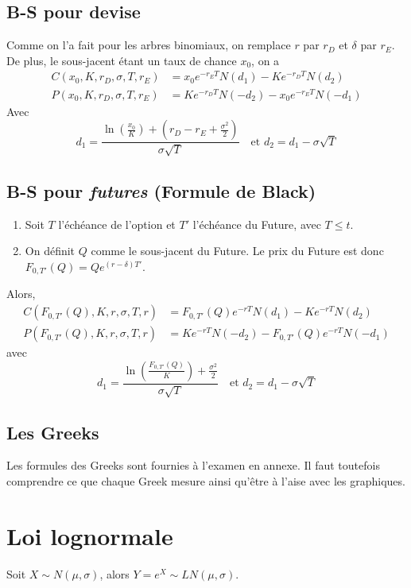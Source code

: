 \documentclass[10pt, french]{article}
\begin{document}
\begin{multicols*}{2}
\subsection*{B-S pour devise}
Comme on l'a fait pour les arbres binomiaux, on remplace $r$ par $r_D$ et $\delta$ par $r_E$. De plus, le sous-jacent étant un taux de chance $x_0$, on a
\begin{align*}
C(x_0, K, r_D, \sigma , T, r_E) & = x_0 e^{-r_E T} N(d_1) - K e^{-r_D T} N(d_2) \\
P(x_0, K, r_D, \sigma , T, r_E) & = K e^{-r_D T} N(-d_2) - x_0 e^{-r_E T} N(-d_1) 
\end{align*}
Avec 
\[d_1 = \frac{\ln \left( \frac{x_0}{K}  \right) + \left( r_D - r_E + \frac{\sigma^2}{2} \right)}{\sigma \sqrt{T}}  \ \ \  \text{ et } d_2 = d_1 - \sigma \sqrt{T} \]


\subsection*{B-S pour \emph{futures} (Formule de Black)}
\begin{enumerate}
\item Soit $T$ l'échéance de l'option et $T' $ l'échéance du Future, avec $T \leq t$.
\item On définit $Q$ comme le sous-jacent du Future. Le prix du Future est donc $F_{0, T'}(Q) = Q e^{(r-\delta) T'}$. 
\end{enumerate}
Alors,
\begin{align*}
C(F_{0, T'}(Q), K, r, \sigma, T, r) & = F_{0, T'}(Q) e^{-r T} N(d_1) - K e^{-r T} N(d_2) \\
P(F_{0, T'}(Q), K, r, \sigma, T, r) & = K e^{-r T} N(-d_2) -  F_{0, T'}(Q) e^{-r T} N(- d_1)
\end{align*}
avec
\[d_1 = \frac{\ln \left( \frac{F_{0,T'}(Q)}{K} \right) + \frac{\sigma^2}{2}}{\sigma \sqrt{T}}    \ \ \  \text{ et } d_2 = d_1 - \sigma \sqrt{T} \]

\subsection*{Les Greeks}
Les formules des Greeks sont fournies à l'examen en annexe. Il faut toutefois comprendre ce que chaque Greek mesure ainsi qu'être à l'aise avec les graphiques.



\setcounter{section}{17}
\section{Loi lognormale}
Soit $X \sim N(\mu, \sigma)$, alors $Y = e^{X} \sim LN(\mu, \sigma)$. 











\end{multicols*}

\end{document}
